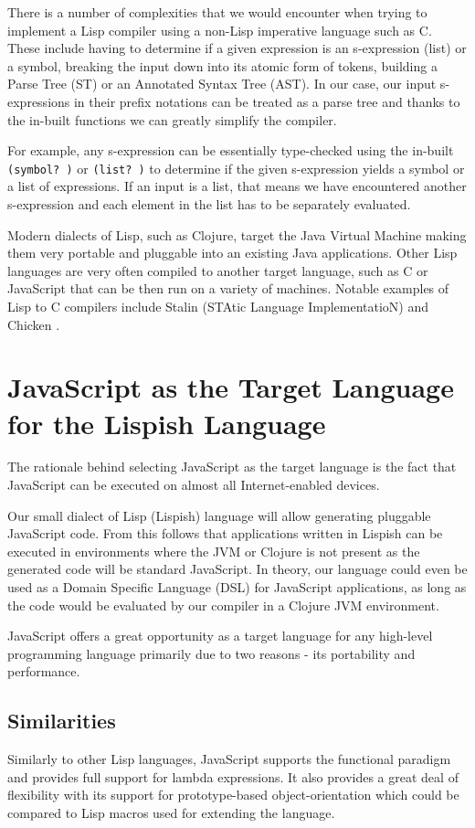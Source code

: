 There is a number of complexities that we would encounter when trying to implement a Lisp compiler using a non-Lisp imperative language such as C.
These include having to determine if a given expression is an s-expression (list) or a symbol, breaking the input down into its atomic form of tokens, building a Parse Tree (ST) or an Annotated Syntax Tree (AST).
In our case, our input s-expressions in their prefix notations can be treated as a parse tree and thanks to the in-built functions we can greatly simplify the compiler.

For example, any s-expression can be essentially type-checked using the in-built \texttt{(symbol? )} or \texttt{(list? )} to determine if the given s-expression yields a symbol or a list of expressions. If an input is a list, that means we have encountered another s-expression and each element in the list has to be separately evaluated.

Modern dialects of Lisp, such as Clojure, target the Java Virtual Machine making them very portable and pluggable into an existing Java applications.
Other Lisp languages are very often compiled to another target language, such as C or JavaScript that can be then run on a variety of machines. Notable examples of Lisp to C compilers include Stalin \cite{stalin} (STAtic Language ImplementatioN) and Chicken \cite{chicken}. 

\section{JavaScript as the Target Language for the Lispish Language}
The rationale behind selecting JavaScript as the target language is the fact that JavaScript can be executed on almost all Internet-enabled devices.

Our small dialect of Lisp (Lispish) language will allow generating pluggable JavaScript code.
From this follows that applications written in Lispish can be executed in environments where the JVM or Clojure is not present as the generated code will be standard JavaScript.
In theory, our language could even be used as a Domain Specific Language (DSL) for JavaScript applications, as long as the code would be evaluated by our compiler in a Clojure JVM environment.

JavaScript offers a great opportunity as a target language for any high-level programming language primarily due to two reasons - its portability and performance.

\subsection{Similarities}
Similarly to other Lisp languages, JavaScript supports the functional paradigm and provides full support for lambda expressions. It also provides a great deal of flexibility with its support for prototype-based object-orientation which could be compared to Lisp macros used for extending the language.

